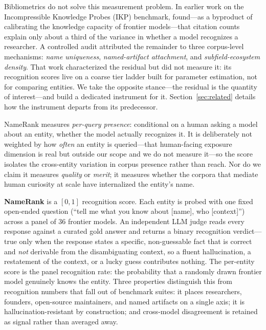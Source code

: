 \documentclass[11pt]{article}
\begin{document}
Bibliometrics do not solve this measurement problem. In earlier work on the Incompressible Knowledge Probes (IKP) benchmark, \citet{li2026ikp} found---as a byproduct of calibrating the knowledge capacity of frontier models---that citation counts explain only about a third of the variance in whether a model recognizes a researcher. A controlled audit attributed the remainder to three corpus-level mechanisms: \emph{name uniqueness}, \emph{named-artifact attachment}, and \emph{subfield-ecosystem density}. That work characterized the residual but did not measure it: its recognition scores live on a coarse tier ladder built for parameter estimation, not for comparing entities. We take the opposite stance---the residual is the quantity of interest---and build a dedicated instrument for it. Section~\ref{sec:related} details how the instrument departs from its predecessor.

NameRank measures \emph{per-query presence}: conditional on a human asking a model about an entity, whether the model actually recognizes it. It is deliberately not weighted by how \emph{often} an entity is queried---that human-facing exposure dimension is real but outside our scope and we do not measure it---so the score isolates the cross-entity variation in corpus presence rather than reach. Nor do we claim it measures \emph{quality} or \emph{merit}; it measures whether the corpora that mediate human curiosity at scale have internalized the entity's name.

\textbf{NameRank} is a $[0,1]$ recognition score. Each entity is probed with one fixed open-ended question (``tell me what you know about [name], who [context]'') across a panel of $36$ frontier models. An independent LLM judge reads every response against a curated gold answer and returns a binary recognition verdict---true only when the response states a specific, non-guessable fact that is correct and \emph{not} derivable from the disambiguating context, so a fluent hallucination, a restatement of the context, or a lucky guess contributes nothing. The per-entity score is the panel recognition rate: the probability that a randomly drawn frontier model genuinely knows the entity. Three properties distinguish this from recognition numbers that fall out of benchmark suites: it places researchers, founders, open-source maintainers, and named artifacts on a single axis; it is hallucination-resistant by construction; and cross-model disagreement is retained as signal rather than averaged away.
\end{document}
